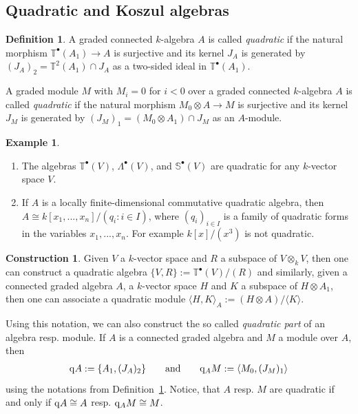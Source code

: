 \documentclass{amsart}
\theoremstyle{definition}
\newtheorem{defn}[thm]{Definition}
\newtheorem{con}[thm]{Construction}
\newtheorem{exmp}[thm]{Example}
\theoremstyle{remark}
\numberwithin{equation}{section}
\begin{document}
\subsection{Quadratic and Koszul algebras}
\label{sec:QuadraticAndKoszulAlgebras}
\begin{defn}
\label{def:quadrati algebra and module}
    A graded connected $k$-algebra $A$ is called \emph{quadratic} if the natural morphism $\mathbb{T}^\bullet(A_1)\to A$ is surjective and its kernel $J_A$ is generated by $(J_A)_2=\mathbb{T}^2(A_1)\cap J_A$ as a two-sided ideal in $\mathbb{T}^\bullet(A_1)$.

    A graded module $M$ with $M_i=0$ for $i<0$ over a graded connected $k$-algebra $A$ is called \emph{quadratic} if the natural morphism $M_0\otimes A\to M$ is surjective and its kernel $J_M$ is generated by $(J_M)_1=(M_0\otimes A_1)\cap J_M$ as an $A$-module.
\end{defn}
\begin{exmp}
    \begin{enumerate}
        \item The algebras $\mathbb{T}^\bullet(V)$, $\Lambda^\bullet(V)$, and $\mathbb{S}^\bullet(V)$ are quadratic for any $k$-vector space $V$.
        \item If $A$ is a locally finite-dimensional commutative quadratic algebra, then $A\cong k[x_1,...,x_n]/(q_i:i\in I)$, where $(q_i)_{i\in I}$ is a family of quadratic forms in the variables $x_1,...,x_n$. For example $k[x]/(x^3)$ is not quadratic.
    \end{enumerate}
\end{exmp}
\begin{con}
    Given $V$ a $k$-vector space and $R$ a subspace of $V\otimes_k V$, then one can construct a quadratic algebra  $\{V,R\}:=\mathbb{T}^\bullet(V)/(R)$ and similarly, given a connected graded algebra $A$, a $k$-vector space $H$ and $K$ a subspace of $H\otimes A_1$, then one can associate a quadratic module $\langle H,K \rangle_A:=(H\otimes A)/\langle K\rangle$.

    Using this notation, we can also construct the so called \emph{quadratic part} of an algebra resp. module. If $A$ is a connected graded algebra and $M$ a module over $A$, then
    \begin{align*}
        {\rm q}A:=\{A_1,(J_A)_2\}\qquad \text{and}\qquad {\rm q}_AM:=\langle M_0,(J_M)_1\rangle 
    \end{align*}
    using the notations from Definition~\ref{def:quadrati algebra and module}. Notice, that $A$ resp. $M$ are quadratic if and only if ${\rm q}A\cong A$ resp. ${\rm q}_AM\cong M$.
\end{con}
\end{document}
